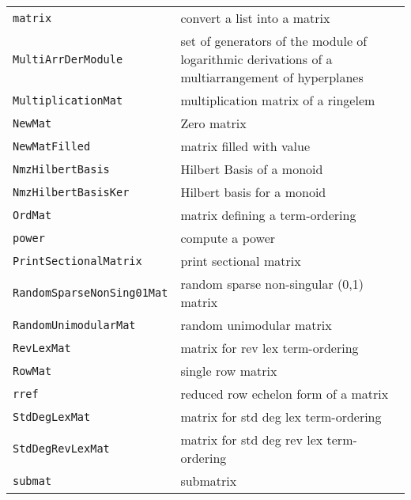 \documentclass[a4paper]{mybook}
\begin{document}
\begin{center}
\begin{longtable}{ll}
{\verb~matrix~} &
      convert a list into a matrix\\
   
{\verb~MultiArrDerModule~} &
      set of generators of the module of logarithmic derivations of a multiarrangement of hyperplanes\\
   
{\verb~MultiplicationMat~} &
      multiplication matrix of a ringelem\\
   
{\verb~NewMat~} &
      Zero matrix\\
   
{\verb~NewMatFilled~} &
      matrix filled with value\\
   
{\verb~NmzHilbertBasis~} &
      Hilbert Basis of a monoid\\
   
{\verb~NmzHilbertBasisKer~} &
      Hilbert basis for a monoid\\
   
{\verb~OrdMat~} &
      matrix defining a term-ordering\\
   
{\verb~power~} &
      compute a power\\
   
{\verb~PrintSectionalMatrix~} &
      print sectional matrix\\
   
{\verb~RandomSparseNonSing01Mat~} &
      random sparse non-singular (0,1) matrix\\
   
{\verb~RandomUnimodularMat~} &
      random unimodular matrix\\
   
{\verb~RevLexMat~} &
      matrix for rev lex term-ordering\\
   
{\verb~RowMat~} &
      single row matrix\\
   
{\verb~rref~} &
      reduced row echelon form of a matrix\\
   
{\verb~StdDegLexMat~} &
      matrix for std deg lex term-ordering\\
   
{\verb~StdDegRevLexMat~} &
      matrix for std deg rev lex term-ordering\\
   
{\verb~submat~} &
      submatrix\\
   

\end{longtable}
\end{center}
\end{document}
